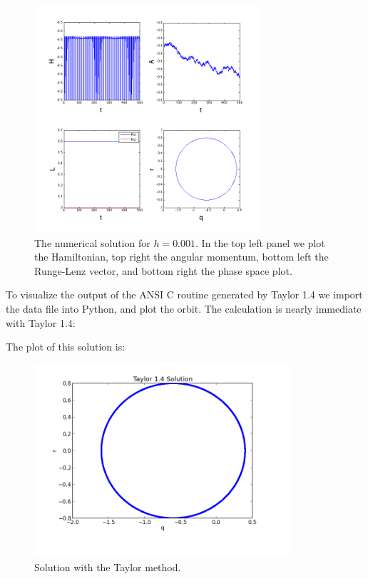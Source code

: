 \documentclass[11pt]{article}
\begin{document}
\begin{figure}[h!]
  \centering
  \includegraphics[width=0.75\textwidth]{code/MATLAB/andy_hw12_03.png}
  \caption{The numerical solution for $h=0.001$.
  In the top left panel we plot the Hamiltonian, top right the angular momentum, bottom left the Runge-Lenz vector, and bottom right the phase space plot.}
\end{figure}

\clearpage
\pagebreak
To visualize the output of the ANSI C routine generated by Taylor 1.4 we import the data file into Python, and plot the orbit.
The calculation is nearly immediate with Taylor 1.4:


The plot of this solution is:
\begin{figure}[h!]
  \centering
    \includegraphics[width=0.85\textwidth]{code/Taylor1.4/figures/test.png}
  \caption{Solution with the Taylor method.}
\end{figure}
\end{document}
